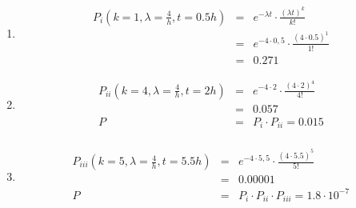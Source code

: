 \documentclass{homework}
\begin{document}
\begin{enumerate}
\begin{enumerate}
\item \begin{eqnarray*}
P_i(k=1, \lambda = \frac{4}{h}, t=0.5h)
& = & e^{-\lambda t} \cdot \frac{(\lambda t)^k}{k!}\\
& = & e^{-4 \cdot 0,5} \cdot \frac{(4 \cdot 0.5)^1}{1!}\\
& = & 0.271
\end{eqnarray*}
\item \begin{eqnarray*}
P_{ii}(k=4, \lambda = \frac{4}{h}, t=2h)
& = & e^{-4 \cdot 2} \cdot \frac{(4 \cdot 2)^4}{4!}\\
& = & 0.057\\
P & = & P_i \cdot P_{ii} = 0.015\\
\end{eqnarray*}
\item \begin{eqnarray*}
P_{iii}(k=5, \lambda = \frac{4}{h}, t=5.5h)
& = & e^{-4 \cdot 5,5} \cdot \frac{(4 \cdot 5.5)^5}{5!}\\
& = & 0.00001\\
P & = & P_i \cdot P_{ii} \cdot P_{iii} = 1.8 \cdot 10^{-7}\\
\end{eqnarray*}
\end{enumerate}


\end{enumerate}
\end{document}
